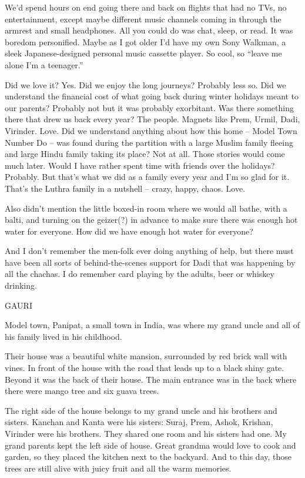 We’d spend hours on end going there and back on flights that had no TVs, no entertainment, except maybe different music channels coming in through the armrest and small headphones. All you could do was chat, sleep, or read. It was boredom personified. Maybe as I got older I’d have my own Sony Walkman, a sleek Japanese-designed personal music cassette player. So cool, so “leave me alone I’m a teenager.”

Did we love it? Yes. Did we enjoy the long journeys? Probably less so. Did we understand the financial cost of what going back during winter holidays meant to our parents? Probably not but it was probably exorbitant. Was there something there that drew us back every year? The people. Magnets like Prem, Urmil, Dadi, Virinder. Love. Did we understand anything about how this home – Model Town Number Do – was found during the partition with a large Muslim family fleeing and large Hindu family taking its place? Not at all. Those stories would come much later. Would I have rather spent time with friends over the holidays? Probably. But that’s what we did as a family every year and I’m so glad for it. That’s the Luthra family in a nutshell – crazy, happy, chaos. Love.


Also didn’t mention the little boxed-in room where we would all bathe, with a balti, and turning on the geizer(?) in advance to make sure there was enough hot water for everyone. How did we have enough hot water for everyone?

And I don’t remember the men-folk ever doing anything of help, but there must have been all sorts of behind-the-scenes support for Dadi that was happening by all the chachas. I do remember card playing by the adults, beer or whiskey drinking. 

GAURI

Model town, Panipat, a small town in India, was where my grand uncle and all of his family lived in his childhood.

Their house was a beautiful white mansion, surrounded by red brick wall with vines. In front of the house with the road that leads up to a black shiny gate. Beyond it was the back of their house. The main entrance was in the back where there were mango tree and six guava trees.

The right side of the house belongs to my grand uncle and his brothers and sisters. Kanchan and Kanta were his sisters: Suraj, Prem, Ashok, Krishan, Virinder were his brothers. They shared one room and his sisters had one. My grand parents kept the left side of house. Great grandma would love to cook and garden, so they placed the kitchen next to the backyard. And to this day, those trees are still alive with juicy fruit and all the warm memories.

